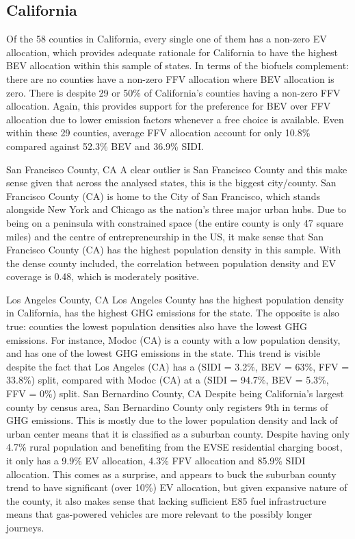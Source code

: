 \documentclass[answers]{exam}
\begin{document}
\subsection{California}
Of the 58 counties in California, every single one of them has a non-zero EV allocation, which provides adequate rationale for California to have the highest BEV allocation within this sample of states. In terms of the biofuels complement: there are no counties have a non-zero FFV allocation where BEV allocation is zero. There is despite 29 or 50\% of California's counties having a non-zero FFV allocation. Again, this provides support for the preference for BEV over FFV allocation due to lower emission factors whenever a free choice is available. Even within these 29 counties, average FFV allocation account for only 10.8\% compared against 52.3\% BEV and 36.9\% SIDI.
\begin{outline}
\1 San Francisco County, CA
\2 A clear outlier is San Francisco County and this make sense given that across the analysed states, this is the biggest city/county. San Francisco County (CA) is home to the City of San Francisco, which stands alongside New York and Chicago as the nation's three major urban hubs. Due to being on a peninsula with constrained space (the entire county is only 47 square miles) and the centre of entrepreneurship in the US, it make sense that San Francisco County (CA) has the highest population density in this sample. With the dense county included, the correlation between population density and EV coverage is 0.48, which is moderately positive.

\1 Los Angeles County, CA
\2 Los Angeles County has the highest population density in California, has the highest GHG emissions for the state. The opposite is also true: counties the lowest population densities also have the lowest GHG emissions. For instance, Modoc (CA) is a county with a low population density, and has one of the lowest GHG emissions in the state. This trend is visible despite the fact that Los Angeles (CA) has a (SIDI = 3.2\%, BEV = 63\%, FFV = 33.8\%) split, compared with Modoc (CA) at a (SIDI = 94.7\%, BEV = 5.3\%, FFV = 0\%) split.
\1 San Bernardino County, CA
\2 	Despite being California's largest county by census area, San Bernardino County only registers 9th in terms of GHG emissions. This is mostly due to the lower population density and lack of urban center means that it is classified as a suburban county. Despite having only 4.7\% rural population and benefiting from the EVSE residential charging boost, it only has a 9.9\% EV allocation, 4.3\% FFV allocation and 85.9\% SIDI allocation. This comes as a surprise, and appears to buck the suburban county trend to have significant (over 10\%) EV allocation, but given expansive nature of the county, it also makes sense that lacking sufficient E85 fuel infrastructure means that gas-powered vehicles are more relevant to the possibly longer journeys.  
\end{outline}
\newpage
\newpage
\end{document}
